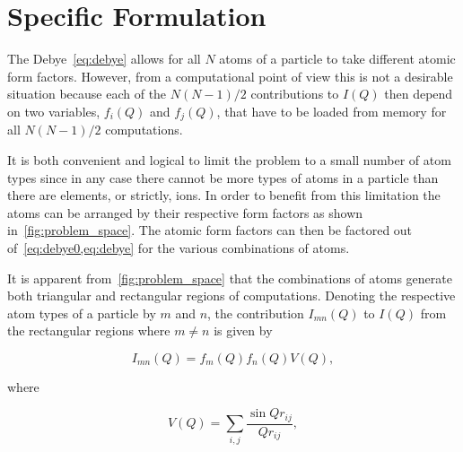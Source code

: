 \documentclass[11pt,twoside]{report}
\begin{document}



\section{Specific Formulation}
\label{sec:spec_debye}
The Debye~\cref{eq:debye} allows for all $N$ atoms of a particle to take different atomic form factors. However, from a computational point of view this is not a desirable situation because each of the $N(N-1)/2$ contributions to $I(Q)$ then depend on two variables, $f_{i}(Q)$ and $f_{j}(Q)$, that have to be loaded from memory for all $N(N-1)/2$ computations. 

\indent It is both convenient and logical to limit the problem to a small number of atom types since in any case there cannot be more types of atoms in a particle than there are elements, or strictly, ions.  In order to benefit from this limitation the atoms can be arranged by their respective form factors as shown in~\cref{fig:problem_space}. The atomic form factors can then be factored out of~\cref{eq:debye0,eq:debye} for the various combinations of atoms.



\indent It is apparent from~\cref{fig:problem_space} that the combinations of atoms generate both triangular and rectangular regions of computations.  Denoting the respective atom types of a particle by $m$ and $n$, the contribution $I_{mn}(Q)$ to $I(Q)$ from the rectangular regions where $m \neq n$ is given by

\begin{equation}
I_{mn}(Q) = f_{m}(Q)f_{n}(Q)V(Q),
\label{eq:rectangle}
\end{equation} 

\noindent where

\begin{equation}
V(Q) = \sum_{i,j} \frac{\sin{Qr_{ij}}}{Qr_{ij}} ,
\label{eq:rectangle_inner}
\end{equation} 
\end{document}
